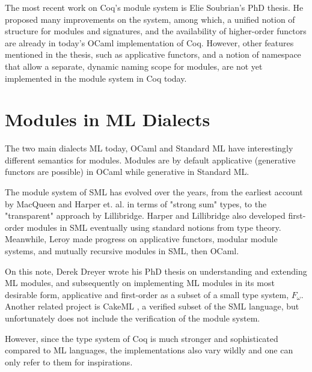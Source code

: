 The most recent work on Coq's module system is Elie Soubrian's PhD thesis. He
proposed many improvements on the system, among which,
a unified notion of structure for modules and signatures, and the availability of
higher-order functors are already in today's OCaml implementation of Coq.
However, other features mentioned in the thesis, such as applicative functors,
and a notion of namespace that allow a separate, dynamic naming scope for modules,
are not yet implemented in the module system in Coq today.

\section{Modules in ML Dialects}
The two main dialects ML today, OCaml and Standard ML have interestingly
different semantics for modules. Modules are by default applicative (generative
functors are possible) in OCaml while generative in Standard ML.

The module system of SML has evolved over the years, from the earliest account
by MacQueen\cite{macqueen1984modules} and Harper et. al. in terms of "strong sum"
types, to the "transparent" approach by Lillibridge. Harper and Lillibridge also
developed first-order modules in SML eventually using standard notions from type
theory. Meanwhile, Leroy made progress on applicative functors, modular module
systems, and mutually recursive modules in SML, then OCaml.

On this note, Derek Dreyer wrote his PhD thesis \cite{dreyerphd} on
understanding and extending ML modules, and subsequently on implementing ML
modules in its most desirable form, applicative and first-order as a subset of a
small type system, $F_\omega$\cite{f-ing}. Another related project is 
CakeML \cite{cakeml}, a verified subset of the SML language, but
unfortunately does not include the verification of the module system.

However, since the type system of Coq
is much stronger and sophisticated compared to ML languages, the
implementations also vary wildly and one can only refer to them for
inspirations.

